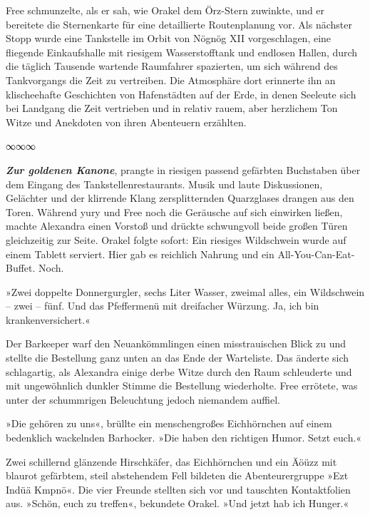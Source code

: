 Free schmunzelte, als er sah, wie Orakel dem Örz-Stern zuwinkte, und er bereitete die Sternenkarte für eine detaillierte Routenplanung vor. Als nächster Stopp wurde eine Tankstelle im Orbit von Nögnög XII vorgeschlagen, eine fliegende Einkaufshalle mit riesigem Wasserstofftank und endlosen Hallen, durch die täglich Tausende wartende Raumfahrer spazierten, um sich während des Tankvorgangs die Zeit zu vertreiben. Die Atmosphäre dort erinnerte ihn an klischeehafte Geschichten von Hafenstädten auf der Erde, in denen Seeleute sich bei Landgang die Zeit vertrieben und in relativ rauem, aber herzlichem Ton Witze und Anekdoten von ihren Abenteuern erzählten.

\begin{center}
∞∞∞
\end{center}

\textit{\textbf{Zur goldenen Kanone}}, prangte in riesigen passend gefärbten Buchstaben über dem Eingang des Tankstellenrestaurants. Musik und laute Diskussionen, Gelächter und der klirrende Klang zersplitternden Quarzglases drangen aus den Toren. Während yury und Free noch die Geräusche auf sich einwirken ließen, machte Alexandra einen Vorstoß und drückte schwungvoll beide großen Türen gleichzeitig zur Seite. Orakel folgte sofort: Ein riesiges Wildschwein wurde auf einem Tablett serviert. Hier gab es reichlich Nahrung und ein All-You-Can-Eat-Buffet. Noch.

»Zwei doppelte Donnergurgler, sechs Liter Wasser, zweimal alles, ein Wildschwein – zwei – fünf. Und das Pfeffermenü mit dreifacher Würzung. Ja, ich bin krankenversichert.«

Der Barkeeper warf den Neuankömmlingen einen misstrauischen Blick zu und stellte die Bestellung ganz unten an das Ende der Warteliste. Das änderte sich schlagartig, als Alexandra einige derbe Witze durch den Raum schleuderte und mit ungewöhnlich dunkler Stimme die Bestellung wiederholte. Free errötete, was unter der schummrigen Beleuchtung jedoch niemandem auffiel.

»Die gehören zu uns«, brüllte ein menschengroßes Eichhörnchen auf einem bedenklich wackelnden Barhocker. »Die haben den richtigen Humor. Setzt euch.«

Zwei schillernd glänzende Hirschkäfer, das Eichhörnchen und ein Äöüzz mit blaurot gefärbtem, steil abstehendem Fell bildeten die Abenteurergruppe »Ezt Indüä Kmpnö«. Die vier Freunde stellten sich vor und tauschten Kontaktfolien aus. »Schön, euch zu treffen«, bekundete Orakel. »Und jetzt hab ich Hunger.«


